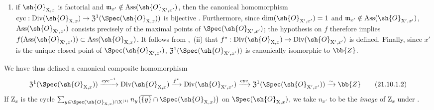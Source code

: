 \begin{env}[21.10.1]
\begin{enumerate}[label=\arabic*\textsuperscript{o}]
  \item if $\sh{O}_{\mathrm{X},x}$ is factorial and $\mathfrak{m}_{x'}\notin\operatorname{Ass}(\sh{O}_{\mathrm{X}',x'})$, then the canonical homomorphism $\operatorname{cyc}:\operatorname{Div}(\sh{O}_{\mathrm{X},x})\to\mathfrak{Z}^1(\Spec(\sh{O}_{\mathrm{X},x}))$ is bijective .
Furthermore, since $\dim(\sh{O}_{\mathrm{X}',x'})=1$ and $\mathfrak{m}_{x'}\notin\operatorname{Ass}(\sh{O}_{\mathrm{X}',x'})$, $\operatorname{Ass}(\sh{O}_{\mathrm{X}',x'})$ consists precisely of the maximal points of $\Spec(\sh{O}_{\mathrm{X}',x'})$; the hypothesis on $f$ therefore implies
$f(\operatorname{Ass}(\sh{O}_{\mathrm{X}',x'}))\subset\operatorname{Ass}(\sh{O}_{\mathrm{X},x})$.
It follows from ,{}~(ii) that $f^*:\operatorname{Div}(\sh{O}_{\mathrm{X},x})\to\operatorname{Div}(\sh{O}_{\mathrm{X}',x'})$ is defined.
Finally, since $x'$ is the unique closed point of $\Spec(\sh{O}_{\mathrm{X}',x'})$, $\mathfrak{Z}^1(\Spec(\sh{O}_{\mathrm{X}',x'}))$ is canonically isomorphic to $\bb{Z}$.
\end{enumerate}
We have thus defined a canonical composite homomorphism
\[
\label{IV.21.10.1.2}
  \mathfrak{Z}^1(\Spec(\sh{O}_{\mathrm{X},x})) \xrightarrow{\operatorname{cyc}^{-1}} \operatorname{Div}(\sh{O}_{\mathrm{X},x}) \xrightarrow{f^*} \operatorname{Div}(\sh{O}_{\mathrm{X}',x'}) \xrightarrow{\operatorname{cyc}} \mathfrak{Z}^1(\Spec(\sh{O}_{\mathrm{X}',x'})) \xrightarrow{\sim} \bb{Z}
  \tag{21.10.1.2}
\]
If $\mathrm{Z}_x$ is the cycle
$\sum_{y\in\Spec(\sh{O}_{\mathrm{X},x})\cap\mathrm{X}^{(1)}}n_y\bigl(\overline{\{y\}}\cap\Spec(\sh{O}_{\mathrm{X},x})\bigr)$ on $\Spec(\sh{O}_{\mathrm{X},x})$, we take $n_{x'}$ to be the \emph{image} of $\mathrm{Z}_x$ under .
\end{env}

